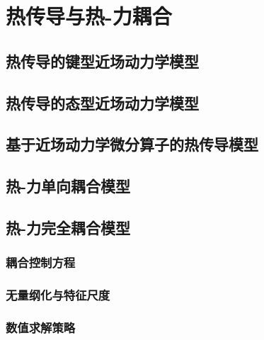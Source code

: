 \chapter{热传导与热-力耦合}

\section{热传导的键型近场动力学模型}

\section{热传导的态型近场动力学模型}

\section{基于近场动力学微分算子的热传导模型}

\section{热-力单向耦合模型}

\section{热-力完全耦合模型}
\subsection{耦合控制方程}
\subsection{无量纲化与特征尺度}
\subsection{数值求解策略}
